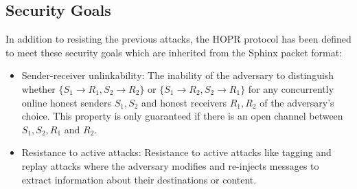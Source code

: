 \subsection*{Security Goals}
In addition to resisting the previous attacks, the HOPR protocol has been defined to meet these security goals which are inherited from the Sphinx packet format:
\begin{itemize}
    \item Sender-receiver unlinkability: The inability of the adversary to distinguish whether $\{S_1\rightarrow R_1, S_2\rightarrow R_2\}$ or $\{S_1\rightarrow R_2, S_2\rightarrow R_1\}$ for any concurrently online honest senders $S_1,S_2$ and honest receivers $R_1,R_2$ of the adversary’s choice. This property is only guaranteed if there is an open channel between $S_1,S_2,R_1$ and $R_2$.
    \item Resistance to active attacks: Resistance to active attacks like tagging and replay attacks where the adversary modifies and re-injects messages to extract information about their destinations or content.
    
\end{itemize}




